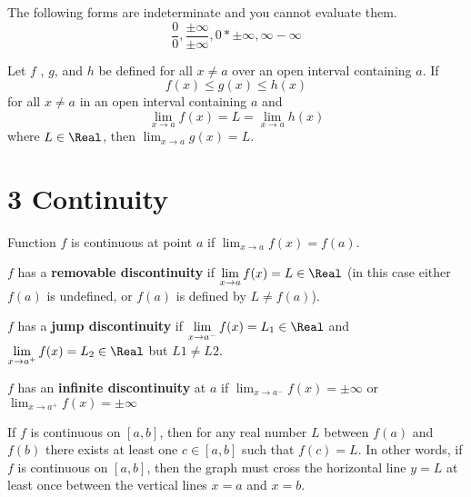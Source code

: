 \begin{definition}
  The following forms are indeterminate and you cannot evaluate them.
  \[
    \frac{0}{0}, \frac{\pm\infty}{\pm\infty}, 0*\pm\infty, \infty - \infty
  \]
\end{definition}


\begin{namedtheorem}
  Let $f$ , $g$, and $h$ be defined for all $x \neq a$ over an open interval containing $a$. If
  $$
    f(x) \leq g(x) \leq h(x)
  $$
  for all $x \neq a$ in an open interval containing $a$ and
  $$
  \lim_{x \to a} f (x) = L = \lim_{x \to a} h(x)
  $$
  where $L \in \Real$, then $\lim_{x \to a} g(x) = L$.
\end{namedtheorem}

\section*{3 Continuity}

\begin{definition}
  Function $f$ is continuous at point $a$ if $\displaystyle\lim_{x \to a} f (x) = f (a)$.
\end{definition}

\begin{definition}
  $f$ has a \textbf{removable discontinuity} if $\displaystyle\lim_{x \to a} f (x) = L \in \Real$ (in this case either $f (a)$ is undefined, or $f (a)$ is defined by $L \neq f (a)$).
\end{definition}
\begin{definition}
  $f$ has a \textbf{jump discontinuity} if $\displaystyle\lim_{x \to a^-} f (x) = L_1 \in \Real$ and $\displaystyle\lim_{x \to a^+} f (x) = L_2 \in \Real$ but $L1 \neq L2$.
\end{definition}
\begin{definition}
  $f$ has an \textbf{infinite discontinuity} at $a$ if $\displaystyle\lim_{x \to a^-} f (x) = \pm\infty$ or $\displaystyle\lim_{x \to a^+} f (x) = \pm\infty$
\end{definition}

\begin{namedtheorem}
  If $f$ is continuous on $[a, b]$, then for any real number $L$ between $f (a)$ and $f (b)$ there exists at least one $c \in [a, b]$ such that $f (c) = L$. In other
  words, if $f$ is continuous on $[a, b]$, then the graph must cross the horizontal line $y = L$ at least once
  between the vertical lines $x = a$ and $x = b$.
\end{namedtheorem}

